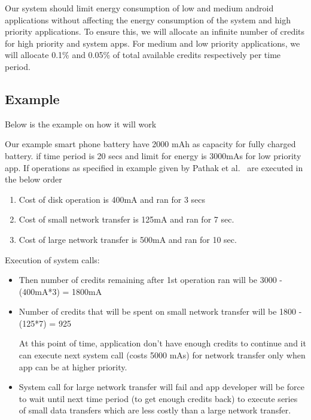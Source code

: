 Our system should limit energy consumption of low and medium android applications without affecting the energy consumption of the system and high priority applications. To ensure this, we will allocate an infinite number of credits for high priority and system apps. For medium and low priority applications, we will allocate 0.1\% and 0.05\% of total available credits respectively per time period. 

\subsection{Example}
Below is the example on how it will work

Our example smart phone battery have 2000 mAh as capacity for fully charged battery. if time period is 20 secs and limit for energy is 3000mAs for low priority app. If operations as specified in example given by Pathak et al.~\cite{pathak2012energy} are executed in the below order

\begin{enumerate}
\item Cost of disk operation is 400mA and ran for 3 secs
\item Cost of small network transfer is 125mA and ran for 7 sec.
\item Cost of large network transfer is 500mA and ran for 10 sec.
\end{enumerate}

Execution of system calls:

\begin{itemize}

\item Then number of credits remaining after 1st operation ran will be 3000 - (400mA*3) = 1800mA

\item Number of credits that will be spent on small network transfer will be 1800 - (125*7) = 925

At this point of time, application don't have enough credits to continue and it can execute next system call (costs 5000 mAs) for network transfer only when app can be at higher priority.

\item System call for large network transfer will fail and app developer will be force to wait until next time period (to get enough credits back) to execute series of small data transfers which are less costly than a large network transfer.

\end{itemize}

